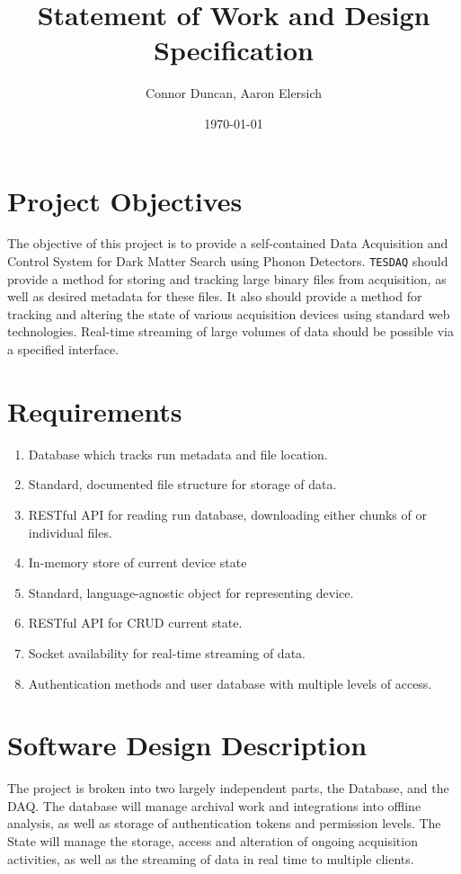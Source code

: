 \documentclass{article}
\author{Connor Duncan, Aaron Elersich}
\date{\today}
\title{\td Statement of Work and Design Specification}
\newcommand{\td}{\texttt{TESDAQ} }
\begin{document}
\maketitle
\tableofcontents
\section{Project Objectives}
The objective of this project is to provide a self-contained Data Acquisition and Control System for Dark Matter Search using Phonon Detectors.
\td should provide a method for storing and tracking large binary files from acquisition, as well as desired metadata for these files.
It also should provide a method for tracking and altering the state of various acquisition devices using standard web technologies.
Real-time streaming of large volumes of data should be possible via a specified interface.
\section{Requirements}
\begin{enumerate}
	\item Database which tracks run metadata and file location.
	\item Standard, documented file structure for storage of data.
	\item RESTful API for reading run database, downloading either chunks of or individual files.
	\item In-memory store of current device state
	\item Standard, language-agnostic object for representing device.
	\item RESTful API for CRUD current state.
	\item Socket availability for real-time streaming of data.
	\item Authentication methods and user database with multiple levels of access.
\end{enumerate}
\section{Software Design Description}
The project is broken into two largely independent parts, the Database, and the DAQ.
The database will manage archival work and integrations into offline analysis, as well as storage of authentication tokens and permission levels.
The State will manage the storage, access and alteration of ongoing acquisition activities, as well as the streaming of data in real time to multiple clients.
\end{document}
